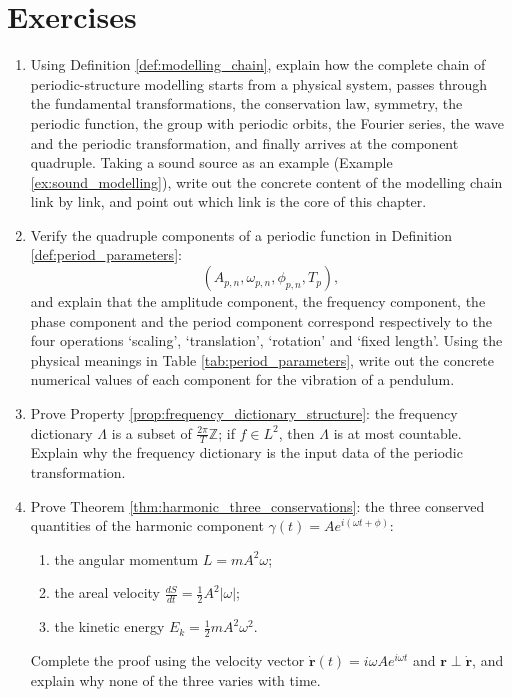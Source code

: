 \section*{Exercises}

\begin{enumerate}[leftmargin=3em, label=\textbf{Exercise \arabic*}]
    \item Using Definition \ref{def:modelling_chain}, explain how the complete chain of periodic-structure modelling starts from a physical system, passes through the fundamental transformations, the conservation law, symmetry, the periodic function, the group with periodic orbits, the Fourier series, the wave and the periodic transformation, and finally arrives at the component quadruple. Taking a sound source as an example (Example \ref{ex:sound_modelling}), write out the concrete content of the modelling chain link by link, and point out which link is the core of this chapter.

    \item Verify the quadruple components of a periodic function in Definition \ref{def:period_parameters}:
    \[
    (A_{p,n},\omega_{p,n},\phi_{p,n},T_p),
    \]
    and explain that the amplitude component, the frequency component, the phase component and the period component correspond respectively to the four operations `scaling', `translation', `rotation' and `fixed length'. Using the physical meanings in Table \ref{tab:period_parameters}, write out the concrete numerical values of each component for the vibration of a pendulum.

    \item Prove Property \ref{prop:frequency_dictionary_structure}:
    the frequency dictionary $\Lambda$ is a subset of $\frac{2\pi}{T}\mathbb{Z}$; if $f\in L^2$, then $\Lambda$ is at most countable.
    Explain why the frequency dictionary is the input data of the periodic transformation.

    \item Prove Theorem \ref{thm:harmonic_three_conservations}:
    the three conserved quantities of the harmonic component $\gamma(t)=Ae^{i(\omega t+\phi)}$:
    \begin{enumerate}[label=(\roman*)]
        \item the angular momentum $L=mA^2\omega$;
        \item the areal velocity $\frac{dS}{dt}=\frac12A^2|\omega|$;
        \item the kinetic energy $E_k=\frac12mA^2\omega^2$.
    \end{enumerate}
    Complete the proof using the velocity vector $\dot{\mathbf{r}}(t)=i\omega Ae^{i\omega t}$ and $\mathbf{r}\perp\dot{\mathbf{r}}$, and explain why none of the three varies with time.


\end{enumerate}
